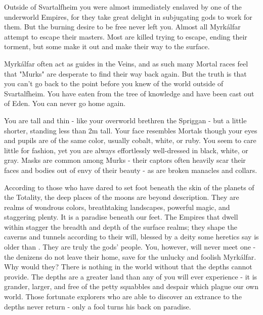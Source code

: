 {  Outside of Svartalfheim you were almost immediately enslaved by one of the underworld Empires, for they take great delight in subjugating gods to work for them.  But the burning desire to be free never left you. Almost all Myrkálfar attempt to escape their masters.  Most are killed trying to escape, ending their torment, but some make it out and make their way to the surface.  

  Myrkálfar often act as guides in the Veins, and as such many Mortal races feel that "Murks" are desperate to find their way back again. But the truth is that you can't go back to the point before you knew of the world outside of Svartalfheim.  You have eaten from the tree of knowledge and have been cast out of Eden.  You can never go home again.

  You are tall and thin - like your overworld brethren the Spriggan - but a little shorter, standing less than 2m tall.  Your face resembles Mortals though your eyes and pupils are of the same color,  usually cobalt, white, or ruby.  You seem to care little for fashion, yet you are always effortlessly well-dressed in black, white, or gray.  Masks are common among Murks - their captors often heavily scar their faces and bodies out of envy of their beauty - as are broken manacles and collars.





  According to those who have dared to set foot beneath the skin of the planets of the Totality, the deep places of the moons are beyond description.  They are realms of wondrous colors, breathtaking landscapes, powerful magic, and staggering plenty.  It is a paradise beneath our feet.  The Empires that dwell within stagger the breadth and depth of the surface realms; they shape the caverns and tunnels according to their will, blessed by a deity some heretics say is older than \TheAuthority.  They are truly the gods' people.  You, however, will never meet one - the denizens do not leave their home, save for the unlucky and foolish Myrkálfar.  Why would they?  There is nothing in the world without that the depths cannot provide.  The depths are a greater land than any of you will ever experience - it is grander, larger, and free of the petty squabbles and despair which plague our own world.  Those fortunate explorers who are able to discover an extrance to the depths never return - only a fool turns his back on paradise.\footnotemark[\value{footnote}]

}
